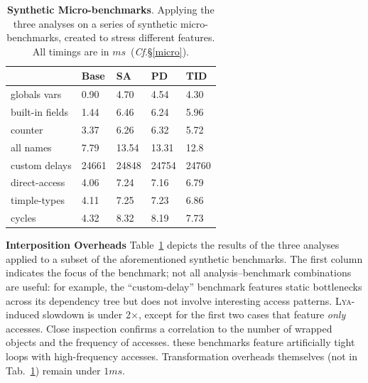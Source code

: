 \documentclass[letterpaper,twocolumn,10pt]{article}
\newcommand{\heading}[1]{\vspace{2pt}\noindent\textbf{#1}\enspace}
\newcommand{\cf}[1]{(\emph{Cf}.\S\ref{#1})}
\newcommand{\sys}{{\scshape Lya}\xspace}
\begin{document}
\begin{table}[t]
\center
\footnotesize
\setlength\tabcolsep{3pt}
\caption{
  \footnotesize{
    \textbf{Synthetic Micro-benchmarks}.
		Applying the three analyses on a series of synthetic micro-benchmarks, created to stress different features.
    All timings are in $ms$~\cf{micro}.
  }
}
\begin{tabular*}{\columnwidth}{l @{\extracolsep{\fill}} lll l}
\toprule
	               &   Base    &  SA     & PD      &  TID    \\
\midrule
globals vars     &   0.90    &  4.70   &  4.54   &  4.30   \\
built-in fields  &   1.44    &  6.46   &  6.24   &  5.96   \\
counter          &   3.37    &  6.26   &  6.32   &  5.72   \\
all names        &   7.79    &  13.54  &  13.31  &  12.8   \\
custom delays    &   24661   &  24848  &  24754  &  24760  \\
direct-access    &   4.06    &  7.24   &  7.16   &  6.79   \\
timple-types     &   4.11    &  7.25   &  7.23   &  6.86   \\
cycles           &   4.32    &  8.32   &  8.19   &  7.73   \\
\bottomrule
\end{tabular*}
\label{tab:synthetic}
\vspace{-5mm}
\end{table}


\heading{Interposition Overheads}
Table~\ref{tab:synthetic} depicts the results of the three analyses applied to a subset of the aforementioned synthetic benchmarks.
The first column indicates the focus of the benchmark; not all analysis--benchmark combinations are useful:
  for example, the ``custom-delay'' benchmark features static bottlenecks across its dependency tree but does not involve interesting access patterns.
\sys-induced slowdown is under 2$\times$, except for the first two cases that feature \emph{only} accesses.
Close inspection confirms a correlation to the number of wrapped objects and the frequency of accesses.
  these benchmarks feature artificially tight loops with high-frequency accesses.
Transformation overheads themselves (not in Tab.~\ref{tab:synthetic}) remain under $1ms$.
\end{document}

